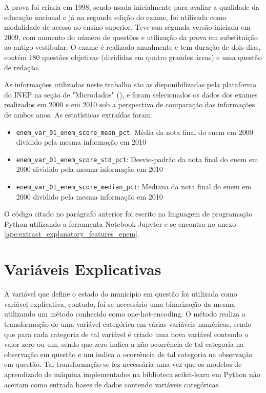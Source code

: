 A prova foi criada em 1998, sendo usada inicialmente para avaliar a qualidade da educação nacional e já na segunda edição do exame, foi utilizada como modalidade de acesso ao ensino superior. Teve sua segunda versão iniciada em 2009, com aumento do número de questões e utilização da prova em substituição ao antigo vestibular. O exame é realizado anualmente e tem duração de dois dias, contém 180 questões objetivas (divididas em quatro grandes áreas) e uma questão de redação.

As informações utilizadas neste trabalho são as disponibilizadas pela plataforma do INEP na seção de "Microdados" (\citet{IBGE}), e foram selecionados os dados dos exames realizados em 2000 e em 2010 sob a perspectiva de comparação das informações de ambos anos. As estatísticas extraídas foram:

\begin{itemize}
	\item \verb|enem_var_01_enem_score_mean_pct|: Média da nota final do enem em 2000 dividido pela mesma informação em 2010
	\item \verb|enem_var_01_enem_score_std_pct|: Desvio-padrão da nota final do enem em 2000 dividido pela mesma informação em 2010
	\item \verb|enem_var_01_enem_score_median_pct|: Mediana da nota final do enem em 2000 dividido pela mesma informação em 2010
\end{itemize}

O código citado no parágrafo anterior foi escrito na linguagem de programação Python utilizando a ferramenta Notebook Jupyter e se encontra no anexo \ref{ape:extract_explanatory_features_enem}.

\section{Variáveis Explicativas}
\label{sec:variaveis_explicativas}

A variável que define o estado do município em questão foi utilizada como variável explicativa, contudo, foi-se necessário uma binarização da mesma utilizando um método conhecido como one-hot-encoding. O método realiza a transformação de uma variável categórica em várias variáveis numéricas, sendo que para cada categoria de tal variável é criado uma nova variável contendo o valor zero ou um, sendo que zero indica a não ocorrência de tal categoria na observação em questão e um indica a ocorrência de tal categoria na observação em questão. Tal transformação se fez necessária uma vez que os modelos de aprendizado de máquina implementados na biblioteca scikit-learn em Python não aceitam como entrada bases de dados contendo variáveis categóricas.

